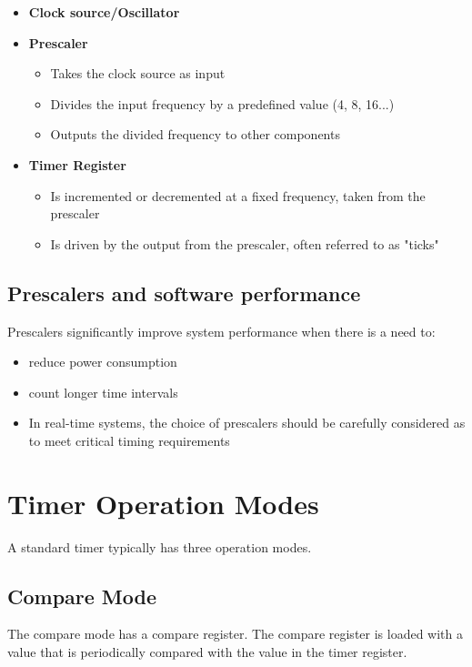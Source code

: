 \begin{itemize}
    \item \textbf{Clock source/Oscillator}
    \item \textbf{Prescaler}
    \begin{itemize}
        \item[] Takes the clock source as input
        \item[] Divides the input frequency by a predefined value (4, 8, 16...)
        \item[] Outputs the divided frequency to other components
    \end{itemize}
    \item \textbf{Timer Register}
    \begin{itemize}
        \item[] Is incremented or decremented at a fixed frequency, taken from the prescaler
        \item[] Is driven by the output from the prescaler, often referred to as "ticks"
    \end{itemize}
\end{itemize}


\subsection{Prescalers and software performance}

Prescalers significantly improve system performance when there is a need to:

\begin{itemize}
    \item reduce power consumption
    \item count longer time intervals
    \item In real-time systems, the choice of prescalers should be carefully considered as to meet critical timing requirements
\end{itemize}


\section{Timer Operation Modes}

A standard timer typically has three operation modes.

\subsection{Compare Mode}

The compare mode has a compare register.
The compare register is loaded with a value that is periodically compared with the value in the timer
register.

